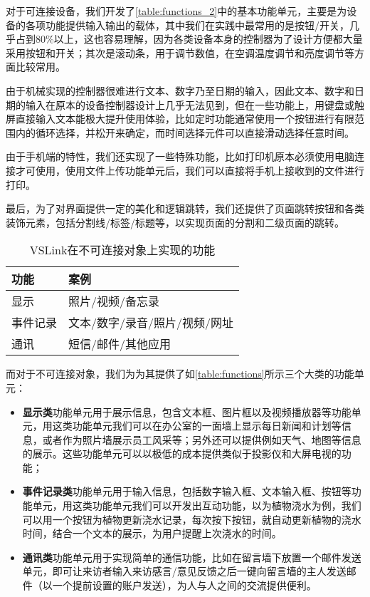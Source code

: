 对于可连接设备，我们开发了\autoref{table:functions_2}中的基本功能单元，主要是为设备的各项功能提供输入输出的载体，其中我们在实践中最常用的是按钮/开关，几乎占到80\%以上，这也容易理解，因为各类设备本身的控制器为了设计方便都大量采用按钮和开关；其次是滚动条，用于调节数值，在空调温度调节和亮度调节等方面比较常用。

由于机械实现的控制器很难进行文本、数字乃至日期的输入，因此文本、数字和日期的输入在原本的设备控制器设计上几乎无法见到，但在一些功能上，用键盘或触屏直接输入文本能极大提升使用体验，比如定时功能通常使用一个按钮进行有限范围内的循环选择，并松开来确定，而时间选择元件可以直接滑动选择任意时间。

由于手机端的特性，我们还实现了一些特殊功能，比如打印机原本必须使用电脑连接才可使用，使用文件上传功能单元后，我们可以直接将手机上接收到的文件进行打印。

最后，为了对界面提供一定的美化和逻辑跳转，我们还提供了页面跳转按钮和各类装饰元素，包括分割线/标签/标题等，以实现页面的分割和二级页面的跳转。

\begin{table}[htbp]
	\caption{VSLink在不可连接对象上实现的功能}  \label{table:functions}  
	\begin{center}  
		\begin{tabular}{|l|l|}  
			\hline  
			\textbf{功能} & \textbf{案例} \\ \hline  
			显示 & 照片/视频/备忘录   \\ \hline 
			事件记录 & 文本/数字/录音/照片/视频/网址   \\ \hline 
			通讯 & 短信/邮件/其他应用   \\ \hline  
		\end{tabular}  
	\end{center}  
\end{table}

而对于不可连接对象，我们为为其提供了如\autoref{table:functions}所示三个大类的功能单元：

\begin{itemize}
	\item \textbf{显示类}功能单元用于展示信息，包含文本框、图片框以及视频播放器等功能单元，用这类功能单元我们可以在办公室的一面墙上显示每日新闻和计划等信息，或者作为照片墙展示员工风采等；另外还可以提供例如天气、地图等信息的展示。这些功能单元可以以极低的成本提供类似于投影仪和大屏电视的功能；
	\item \textbf{事件记录类}功能单元用于输入信息，包括数字输入框、文本输入框、按钮等功能单元，用这类功能单元我们可以开发出互动功能，以为植物浇水为例，我们可以用一个按钮为植物更新浇水记录，每次按下按钮，就自动更新植物的浇水时间，结合一个文本的展示，为用户提醒上次浇水的时间。
	\item \textbf{通讯类}功能单元用于实现简单的通信功能，比如在留言墙下放置一个邮件发送单元，即可让来访者输入来访感言/意见反馈之后一键向留言墙的主人发送邮件（以一个提前设置的账户发送），为人与人之间的交流提供便利。
\end{itemize}


